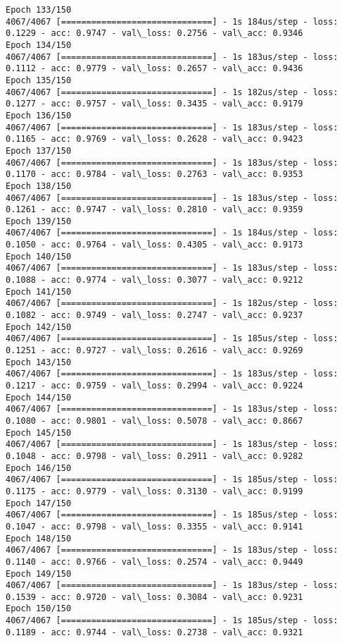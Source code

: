 \documentclass[11pt]{article}
\begin{document}
\begin{Verbatim}[commandchars=\\\{\}]
Epoch 133/150
4067/4067 [==============================] - 1s 184us/step - loss: 0.1229 - acc: 0.9747 - val\_loss: 0.2756 - val\_acc: 0.9346
Epoch 134/150
4067/4067 [==============================] - 1s 183us/step - loss: 0.1112 - acc: 0.9779 - val\_loss: 0.2657 - val\_acc: 0.9436
Epoch 135/150
4067/4067 [==============================] - 1s 182us/step - loss: 0.1277 - acc: 0.9757 - val\_loss: 0.3435 - val\_acc: 0.9179
Epoch 136/150
4067/4067 [==============================] - 1s 183us/step - loss: 0.1165 - acc: 0.9769 - val\_loss: 0.2628 - val\_acc: 0.9423
Epoch 137/150
4067/4067 [==============================] - 1s 183us/step - loss: 0.1170 - acc: 0.9784 - val\_loss: 0.2763 - val\_acc: 0.9353
Epoch 138/150
4067/4067 [==============================] - 1s 183us/step - loss: 0.1261 - acc: 0.9747 - val\_loss: 0.2810 - val\_acc: 0.9359
Epoch 139/150
4067/4067 [==============================] - 1s 184us/step - loss: 0.1050 - acc: 0.9764 - val\_loss: 0.4305 - val\_acc: 0.9173
Epoch 140/150
4067/4067 [==============================] - 1s 183us/step - loss: 0.1088 - acc: 0.9774 - val\_loss: 0.3077 - val\_acc: 0.9212
Epoch 141/150
4067/4067 [==============================] - 1s 182us/step - loss: 0.1082 - acc: 0.9749 - val\_loss: 0.2747 - val\_acc: 0.9237
Epoch 142/150
4067/4067 [==============================] - 1s 185us/step - loss: 0.1251 - acc: 0.9727 - val\_loss: 0.2616 - val\_acc: 0.9269
Epoch 143/150
4067/4067 [==============================] - 1s 183us/step - loss: 0.1217 - acc: 0.9759 - val\_loss: 0.2994 - val\_acc: 0.9224
Epoch 144/150
4067/4067 [==============================] - 1s 183us/step - loss: 0.1080 - acc: 0.9801 - val\_loss: 0.5078 - val\_acc: 0.8667
Epoch 145/150
4067/4067 [==============================] - 1s 183us/step - loss: 0.1048 - acc: 0.9798 - val\_loss: 0.2911 - val\_acc: 0.9282
Epoch 146/150
4067/4067 [==============================] - 1s 185us/step - loss: 0.1175 - acc: 0.9779 - val\_loss: 0.3130 - val\_acc: 0.9199
Epoch 147/150
4067/4067 [==============================] - 1s 185us/step - loss: 0.1047 - acc: 0.9798 - val\_loss: 0.3355 - val\_acc: 0.9141
Epoch 148/150
4067/4067 [==============================] - 1s 183us/step - loss: 0.1140 - acc: 0.9766 - val\_loss: 0.2574 - val\_acc: 0.9449
Epoch 149/150
4067/4067 [==============================] - 1s 183us/step - loss: 0.1539 - acc: 0.9720 - val\_loss: 0.3084 - val\_acc: 0.9231
Epoch 150/150
4067/4067 [==============================] - 1s 185us/step - loss: 0.1189 - acc: 0.9744 - val\_loss: 0.2738 - val\_acc: 0.9321

    \end{Verbatim}
\end{document}
